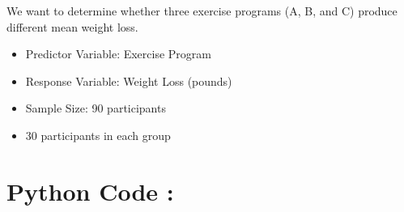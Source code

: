 \documentclass[
]{article}
\begin{document}
We want to determine whether three exercise programs (A, B, and C)
produce different mean weight loss.

\begin{itemize}
\item
  Predictor Variable: Exercise Program
\item
  Response Variable: Weight Loss (pounds)
\item
  Sample Size: 90 participants
\item
  30 participants in each group
\end{itemize}

\section{\texorpdfstring{\textbf{Python Code
:}}{Python Code :}}\label{python-code-7}
\end{document}
